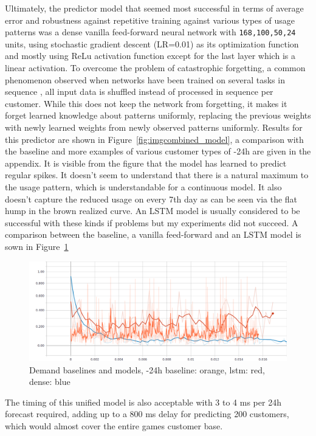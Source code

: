 Ultimately, the predictor model that seemed most successful in terms of average error and robustness against repetitive
training against various types of usage patterns was a dense vanilla feed-forward neural network with
\texttt{168,100,50,24} units, using stochastic gradient descent (LR=0.01) as its optimization function and mostly using
\ac{ReLu} activation function except for the last layer which is a linear activation. To overcome the problem of
catastrophic forgetting, a common phenomenon observed when networks have been trained on several tasks in sequence
\cite[]{french1999catastrophic}, all input data is shuffled instead of processed in sequence per customer. While this
does not keep the network from forgetting, it makes it forget learned knowledge about patterns uniformly, replacing the
previous weights with newly learned weights from newly observed patterns uniformly. Results for this predictor are shown
in Figure~\ref{fig:imgcombined_model}, a comparison with the baseline and more examples of various customer types of
-24h are given in the appendix. It is visible from the figure that the model has learned to predict regular
spikes. It doesn't seem to understand that there is a natural maximum to the usage pattern, which is understandable for
a continuous model. It also doesn't capture the reduced usage on every 7th day as can be seen via the flat hump
in the brown realized curve. An \ac{LSTM} model is usually considered to be successful with these kinds if problems but
my experiments did not succeed. A comparison between the baseline, a vanilla feed-forward and an \ac{LSTM} model is sown
in Figure~\ref{fig:baseline_dense}

\begin{figure}[b]
    \centering
    \includegraphics[width=1.0\linewidth]{img/demand_baselines_2.png}
    \caption{Demand baselines and models, -24h baseline: orange, lstm: red, dense: blue}
    \label{fig:baseline_dense}
\end{figure}


The timing of this unified model is also acceptable with 3 to 4 ms per 24h forecast required, adding up to a 800 ms
delay for predicting 200 customers, which would almost cover the entire games customer base.

